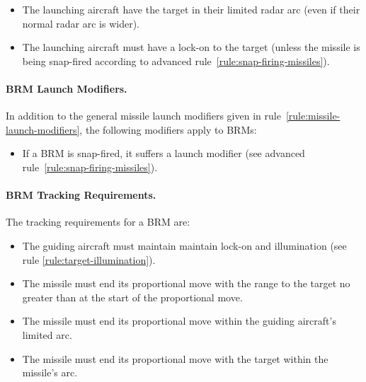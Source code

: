 {\begin{itemize}

    \item The launching aircraft have the target in their limited radar arc (even if their normal radar arc is wider).

    \item The launching aircraft must have a lock-on to the target (unless the missile is being snap-fired according to advanced rule~\ref{rule:snap-firing-missiles}).

\end{itemize}

\paragraph{BRM Launch Modifiers.}
\label{rule:brm-launch-modifiers}

In addition to the general missile launch modifiers given in rule~\ref{rule:missile-launch-modifiers}, the following modifiers apply to BRMs:

\begin{itemize}
    \item If a BRM is snap-fired, it suffers a  launch modifier (see advanced rule~\ref{rule:snap-firing-missiles}).
\end{itemize}

\paragraph{BRM Tracking Requirements.} 
\label{rule:brm-tracking-requirements}

The tracking requirements for a BRM are:

\begin{itemize}

    \item The guiding aircraft must maintain maintain lock-on and illumination (see rule \ref{rule:target-illumination}).

    \item The missile must end its proportional move with the range to the target no greater than at the start of the proportional move.

    \item The missile must end its proportional move within the guiding aircraft's limited arc.

    \item The missile must end its proportional move with the target within the missile's  arc.

\end{itemize}



}

